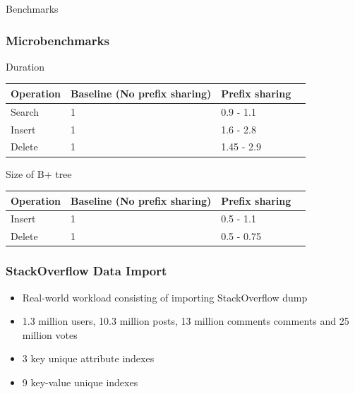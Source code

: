 \documentclass{beamer}
\begin{document}
  \begin{section}{Benchmarks}
    
    \begin{frame}
      \frametitle{Microbenchmarks}
        
        \begin{block}{Duration}
        
        \end{block}
       \begin{tabular}{| l | l | l | l |}
        \hline
        Operation & Baseline (No prefix sharing) & Prefix sharing \\ \hline 
        Search & 1 & 0.9 - 1.1  \\ \hline 
        Insert & 1 & 1.6 - 2.8  \\ \hline 
        Delete & 1 & 1.45 - 2.9  \\ \hline 
      \end{tabular}
      
        \begin{block}{
        Size of B+ tree}
        \end{block}
       \begin{tabular}{| l | l | l | l |}
        \hline
        Operation & Baseline (No prefix sharing) & Prefix sharing \\ \hline 
        Insert & 1 & 0.5 - 1.1  \\ \hline 
        Delete & 1 & 0.5 - 0.75  \\ \hline 
      \end{tabular}
    \end{frame}

    \begin{frame}
      \frametitle{StackOverflow Data Import}
        \begin{itemize}
        \item Real-world workload consisting of importing StackOverflow dump
        \item 1.3 million users, 10.3 million posts, 13 million comments comments and 25 million votes     
        \item 3 key unique attribute indexes 
        \item 9 key-value unique indexes
        \end{itemize}
    \end{frame}
    

\end{section}
\end{document}
